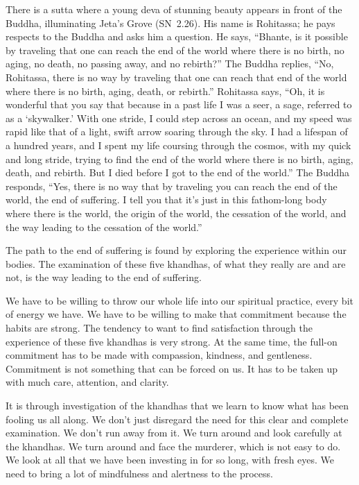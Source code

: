 There is a sutta where a young deva of stunning beauty appears in front of the Buddha, illuminating Jeta's Grove \mbox{(SN 2.26)}. His name is Rohitassa; he pays respects to the Buddha and asks him a question. He says, ``Bhante, is it possible by traveling that one can reach the end of the world where there is no birth, no aging, no death, no passing away, and no rebirth?'' The Buddha replies, ``No, Rohitassa, there is no way by traveling that one can reach that end of the world where there is no birth, aging, death, or rebirth.'' Rohitassa says, ``Oh, it is wonderful that you say that because in a past life I was a seer, a sage, referred to as a `skywalker.' With one stride, I could step across an ocean, and my speed was rapid like that of a light, swift arrow soaring through the sky. I had a lifespan of a hundred years, and I spent my life coursing through the cosmos, with my quick and long stride, trying to find the end of the world where there is no birth, aging, death, and rebirth. But I died before I got to the end of the world.'' The Buddha responds, ``Yes, there is no way that by traveling you can reach the end of the world, the end of suffering. I tell you that it's just in this fathom-long body where there is the world, the origin of the world, the cessation of the world, and the way leading to the cessation of the world.''

The path to the end of suffering is found by exploring the experience within our bodies. The examination of these five khandhas, of what they really are and are not, is the way leading to the end of suffering.

We have to be willing to throw our whole life into our spiritual practice, every bit of energy we have. We have to be willing to make that commitment because the habits are strong. The tendency to want to find satisfaction through the experience of these five khandhas is very strong. At the same time, the full-on commitment has to be made with compassion, kindness, and gentleness. Commitment is not something that can be forced on us. It has to be taken up with much care, attention, and clarity.

It is through investigation of the khandhas that we learn to know what has been fooling us all along. We don't just disregard the need for this clear and complete examination. We don't run away from it. We turn around and look carefully at the khandhas. We turn around and face the murderer, which is not easy to do. We look at all that we have been investing in for so long, with fresh eyes. We need to bring a lot of mindfulness and alertness to the process.

